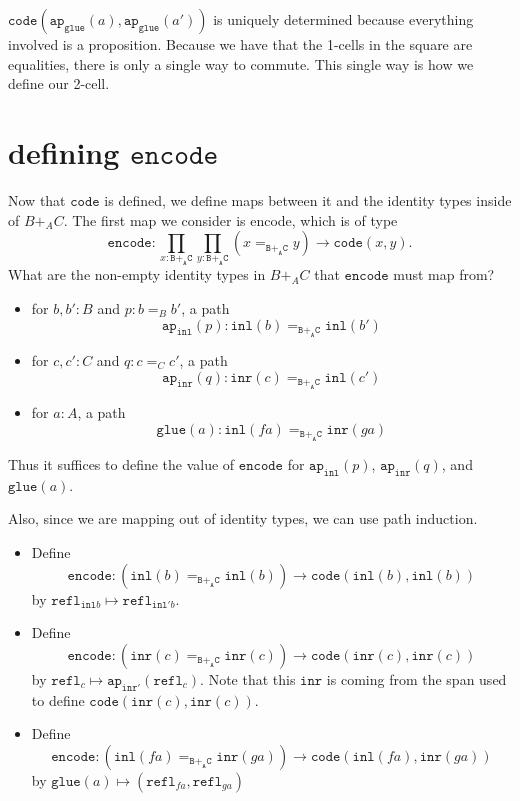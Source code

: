 \message{ !name(notes.tex)}\documentclass[12pt]{amsart}
\newcommand{\from}{\colon}
\newcommand{\type}[1]{\mathtt{#1}}
\newcommand{\A}{\type{A}}
\newcommand{\B}{\type{B}}
\newcommand{\C}{\type{C}}
\newcommand{\BAC}{\B +_{\A} \C}
\newcommand{\ap}{\type{ap}}
\newcommand{\inl}{\type{inl}}
\newcommand{\inr}{\type{inr}}
\newcommand{\glue}{\type{glue}}
\newcommand{\refl}{\type{refl}}
\newcommand{\code}{\type{code}}
\newcommand{\encode}{\type{encode}}
\theoremstyle{remark}
\theoremstyle{definition}
\begin{document}
	$\type{ code } ( \type{ ap }_\type{ glue } ( a ) , \type{ ap }_\type{ glue } ( a' )  )$ is uniquely determined because
	everything involved is a proposition. 
	Because we have that the 1-cells 
	in the square are equalities,
	there is only a single way to commute.
	This single way is how we define our 2-cell.

\pagebreak
\section{defining $\encode$}

Now that $ \code $ is defined, we define maps between it and the identity types inside of $ B+_A C $. The first map we consider is encode, which is of type
\[
	\encode : 
		\prod_{x : \BAC} \prod_{y : \BAC} 
		(x=_{\BAC} y) \to  \code (x,y).
\]
What are the non-empty identity types in $ B+_A C $ that $ \encode $ must map from?  
\begin{itemize}
	\item for $ b,b' : B $ and $ p : b =_B b'  $, a path 
	\[
		\ap_{\inl}(p) : \inl (b) =_{\BAC} \inl (b')
	\]
	\item for $ c,c' : C $ and $ q : c =_C c'  $, a path  
	\[
		\ap_{\inr}(q) : \inr (c) =_{\BAC} \inl (c') 
	\]
	\item for $ a : A $, a path  
	\[
		\glue (a) : \inl(fa) =_{\BAC} \inr(ga)
	\] 
\end{itemize}

Thus it suffices to define the value of $ \encode $ for $ \ap_{\inl}(p) $, $ \ap_{\inr}(q) $, and $ \glue (a) $.  

Also, since we are mapping out of identity types, we can use path induction.

\begin{itemize}
	\item Define 
	\[
		\encode \from (\inl (b) =_{\BAC} \inl (b)) \to \code (\inl(b),\inl(b))
	\] 
	by $ \refl_{\inl b} \mapsto \refl_{\inl' b}  $.
	\item Define 
	\[
		\encode \from (\inr (c) =_{\BAC} \inr (c)) \to \code (\inr(c),\inr(c))
	\] 
	by $ \refl_c \mapsto \ap_{\inr'} (\refl_c)  $. Note that this $ \inr $ is coming from the span used to define $ \code(\inr(c),\inr(c)) $.
	\item Define 
	\[
		\encode \from (\inl (fa) =_{\BAC} \inr (ga)) \to \code (\inl(fa),\inr(ga))
	\]
	by $ \glue (a) \mapsto ( \refl_{fa} , \refl_{ga}) $
\end{itemize}
\end{document}
